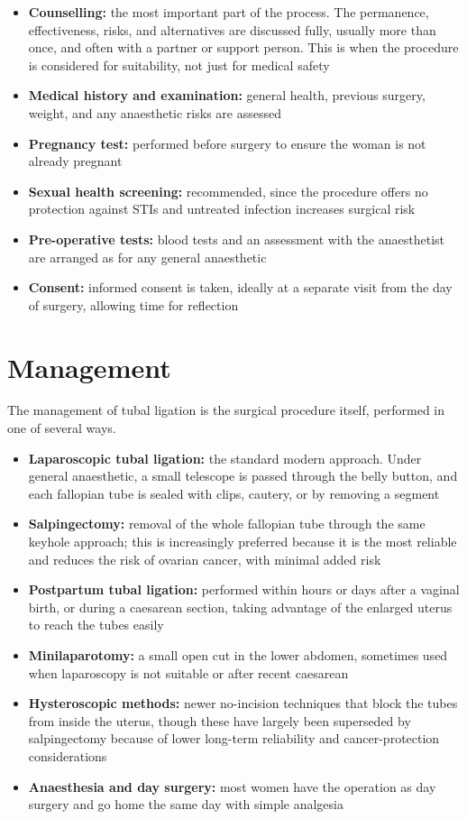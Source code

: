 \begin{itemize}
    \item \textbf{Counselling:} the most important part of the process. The permanence, effectiveness, risks, and alternatives are discussed fully, usually more than once, and often with a partner or support person. This is when the procedure is considered for suitability, not just for medical safety
    \item \textbf{Medical history and examination:} general health, previous surgery, weight, and any anaesthetic risks are assessed
    \item \textbf{Pregnancy test:} performed before surgery to ensure the woman is not already pregnant
    \item \textbf{Sexual health screening:} recommended, since the procedure offers no protection against STIs and untreated infection increases surgical risk
    \item \textbf{Pre-operative tests:} blood tests and an assessment with the anaesthetist are arranged as for any general anaesthetic
    \item \textbf{Consent:} informed consent is taken, ideally at a separate visit from the day of surgery, allowing time for reflection
\end{itemize}

\section*{Management}
The management of tubal ligation is the surgical procedure itself, performed in one of several ways.

\begin{itemize}
    \item \textbf{Laparoscopic tubal ligation:} the standard modern approach. Under general anaesthetic, a small telescope is passed through the belly button, and each fallopian tube is sealed with clips, cautery, or by removing a segment
    \item \textbf{Salpingectomy:} removal of the whole fallopian tube through the same keyhole approach; this is increasingly preferred because it is the most reliable and reduces the risk of ovarian cancer, with minimal added risk
    \item \textbf{Postpartum tubal ligation:} performed within hours or days after a vaginal birth, or during a caesarean section, taking advantage of the enlarged uterus to reach the tubes easily
    \item \textbf{Minilaparotomy:} a small open cut in the lower abdomen, sometimes used when laparoscopy is not suitable or after recent caesarean
    \item \textbf{Hysteroscopic methods:} newer no-incision techniques that block the tubes from inside the uterus, though these have largely been superseded by salpingectomy because of lower long-term reliability and cancer-protection considerations
    \item \textbf{Anaesthesia and day surgery:} most women have the operation as day surgery and go home the same day with simple analgesia
\end{itemize}

